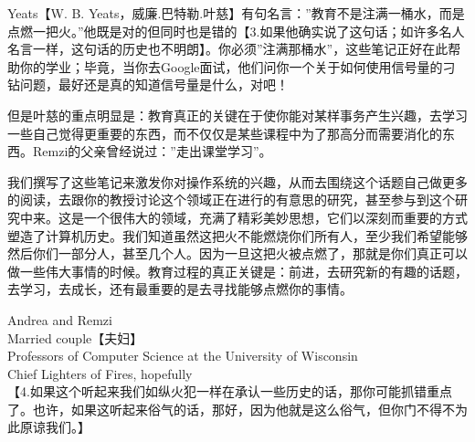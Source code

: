  \vspace*{0.0cm}
\thispagestyle{empty}
\centerline{}\vspace{2cm}

Yeats【W. B. Yeats，威廉.巴特勒.叶慈】有句名言：”教育不是注满一桶水，而是点燃一把火。”他既是对的但同时也是错的【3.如果他确实说了这句话；如许多名人名言一样，这句话的历史也不明朗】。你必须”注满那桶水”，这些笔记正好在此帮助你的学业；毕竟，当你去Google面试，他们问你一个关于如何使用信号量的刁钻问题，最好还是真的知道信号量是什么，对吧！

但是叶慈的重点明显是：教育真正的关键在于使你能对某样事务产生兴趣，去学习一些自己觉得更重要的东西，而不仅仅是某些课程中为了那高分而需要消化的东西。Remzi的父亲曾经说过：”走出课堂学习”。

我们撰写了这些笔记来激发你对操作系统的兴趣，从而去围绕这个话题自己做更多的阅读，去跟你的教授讨论这个领域正在进行的有意思的研究，甚至参与到这个研究中来。这是一个很伟大的领域，充满了精彩美妙思想，它们以深刻而重要的方式塑造了计算机历史。我们知道虽然这把火不能燃烧你们所有人，至少我们希望能够然后你们一部分人，甚至几个人。因为一旦这把火被点燃了，那就是你们真正可以做一些伟大事情的时候。教育过程的真正关键是：前进，去研究新的有趣的话题，去学习，去成长，还有最重要的是去寻找能够点燃你的事情。


Andrea and Remzi\\
Married couple【夫妇】\\
Professors of Computer Science at the University of Wisconsin\\
Chief Lighters of Fires, hopefully\\
【4.如果这个听起来我们如纵火犯一样在承认一些历史的话，那你可能抓错重点了。也许，如果这听起来俗气的话，那好，因为他就是这么俗气，但你门不得不为此原谅我们。】
